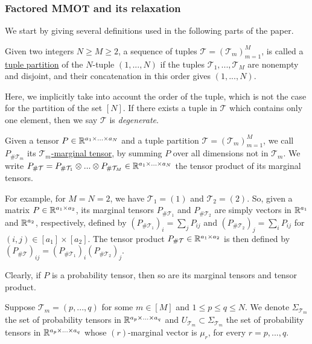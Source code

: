 \subsubsection*{Factored MMOT and its relaxation}
We start by giving several definitions used in the following parts of the paper.
\begin{definition}
 Given two integers $N \geq M \geq 2$, a sequence of tuples $\mathcal T = (\mathcal T_m)_{m=1}^M$, is called a
 \underline{tuple partition} of the $N$-tuple $(1,...,N)$ if the tuples $\mathcal T_1, ..., \mathcal T_M$ are nonempty and disjoint,
 and their concatenation in this order gives $(1,...,N)$.
\end{definition}
Here, we implicitly take into account the order of the tuple, which is not the case for the partition of the set $[N]$. If
there exists a tuple in $\mathcal T$ which contains only one element, then we say $\mathcal T$ is \textit{degenerate}.

\begin{definition}
  Given a tensor $P \in \mathbb R^{a_1 \times ... \times a_N}$ and a tuple partition $\mathcal T = (\mathcal T_m)_{m=1}^M$,
  we call $P_{\# \mathcal T_m}$ its \underline{$\mathcal T_m$-marginal tensor}, by summing $P$ over all dimensions not in $\mathcal T_m$.
  We write $P_{\# \mathcal T} = P_{\# \mathcal T_1} \otimes ... \otimes P_{\# \mathcal T_M} \in \mathbb R^{a_1 \times ... \times a_N}$
  the tensor product of its marginal tensors.
\end{definition}
For example, for $M=N=2$, we have $\mathcal T_1 = (1)$ and $\mathcal T_2 = (2)$. So, given a matrix
$P \in \mathbb R^{a_1 \times a_2}$, its marginal tensors $P_{\# \mathcal T_1}$ and $P_{\# \mathcal T_2}$ are simply vectors in
$\mathbb R^{a_1}$ and $\mathbb R^{a_2}$, respectively, defined by $(P_{\# \mathcal T_1})_i = \sum_j P_{ij}$ and
$(P_{\# \mathcal T_2})_j = \sum_i P_{ij}$ for $(i,j) \in [a_1] \times [a_2]$. The tensor product
$P_{\# \mathcal T} \in \mathbb R^{a_1 \times a_2}$ is then defined by
$(P_{\#\mathcal T})_{ij} = (P_{\# \mathcal T_1})_i (P_{\# \mathcal T_2})_j$.

Clearly, if $P$ is a probability tensor, then so are its marginal tensors and tensor product.

Suppose $\mathcal T_m = (p,...,q)$ for some $m \in [M]$ and $1 \leq p \leq q \leq N$. We denote
$\Sigma_{\mathcal T_m}$ the set of probability tensors in $\mathbb R^{a_p \times ... \times a_q}$ and
$U_{\mathcal T_m} \subset \Sigma_{\mathcal T_m}$ the set
of probability tensors in $\mathbb R^{a_p \times ... \times a_q}$ whose $(r)$-marginal vector is $\mu_r$, for every $r = p,...,q$.

